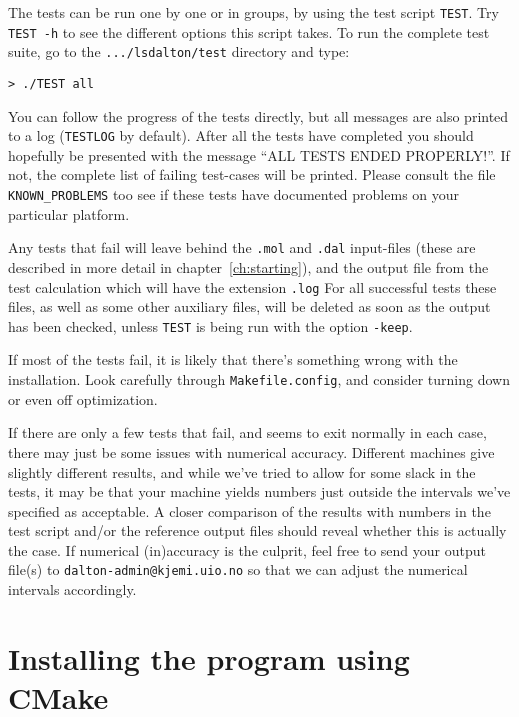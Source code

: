 The tests can be run one by one or in groups, by using the test script
\verb|TEST|. Try \verb|TEST -h| to see the different options this
script takes. 
To run the
complete test suite, go to the \verb|.../lsdalton/test| directory and
type:
\begin{verbatim}
> ./TEST all
\end{verbatim}
You can follow the progress of the tests directly, but all messages
are also printed to a log (\verb|TESTLOG| by default). After all the
tests have completed you should hopefully be presented with the
message ``ALL TESTS ENDED PROPERLY!''. If not, the complete list of 
failing test-cases
will be printed. Please consult the file
\verb|KNOWN_PROBLEMS| too see if these tests have documented problems
on your particular platform. 

Any tests that fail will leave behind the \verb|.mol| and \verb|.dal|
input-files (these are described in more detail in
chapter~\ref{ch:starting}), and the output file from the test
calculation which will have the extension \verb|.log| 
For all
successful tests these files, as well as some other auxiliary files,
will be deleted as soon as the output has been checked, unless
\verb|TEST| is being run with the option \verb|-keep|.

If most of the tests fail, it is likely that there's something
wrong with the installation. Look carefully through
\verb|Makefile.config|, and consider turning down or even off
optimization.

If there are only a few tests that fail, and {\lsdalton} seems to exit
normally in each case, there may just be some issues with numerical
accuracy. Different machines give slightly different results, and
while we've tried to allow for some slack in the tests, it may be
that your machine yields numbers just outside the intervals we've
specified as acceptable. A closer comparison of the results with
numbers in the test script and/or the reference output files should
reveal whether this is actually the case. If numerical (in)accuracy is
the culprit, feel free to send your output file(s) to
\verb|dalton-admin@kjemi.uio.no| so that we can adjust the numerical
intervals accordingly.

\section{Installing the program using CMake}\label{sec:CMake}

